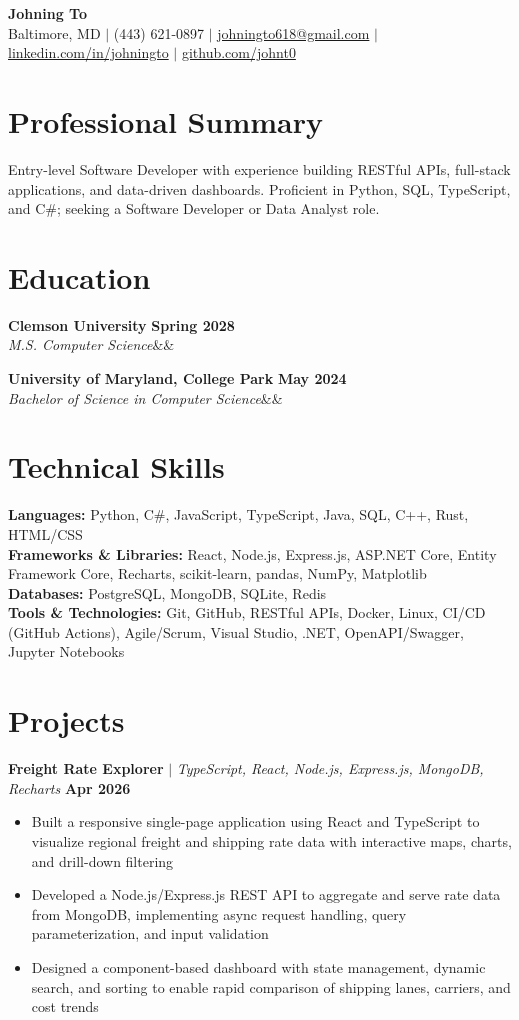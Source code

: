 \documentclass[11pt,letterpaper]{article}
\makeatletter
\newcommand{\name}{Johning To}
\newcommand{\phone}{(443) 621-0897}
\newcommand{\email}{johningto618@gmail.com}
\newcommand{\linkedin}{linkedin.com/in/johningto}
\newcommand{\github}{github.com/johnt0}
\newcommand{\location}{Baltimore, MD}
\newcommand{\summary}{Entry-level Software Developer with experience building RESTful APIs, full-stack applications, and data-driven dashboards. Proficient in Python, SQL, TypeScript, and C\#; seeking a Software Developer or Data Analyst role.}
\newcommand{\languages}{Python, C\#, JavaScript, TypeScript, Java, SQL, C++, Rust, HTML/CSS}
\newcommand{\frameworks}{React, Node.js, Express.js, ASP.NET Core, Entity Framework Core, Recharts, scikit-learn, pandas, NumPy, Matplotlib}
\newcommand{\databases}{PostgreSQL, MongoDB, SQLite, Redis}
\newcommand{\toolstech}{Git, GitHub, RESTful APIs, Docker, Linux, CI/CD (GitHub Actions), Agile/Scrum, Visual Studio, .NET, OpenAPI/Swagger, Jupyter Notebooks}
\newcommand{\education}[4]{%
    \noindent\textbf{#1} \hfill \textbf{#2}\\
    \textit{#3}\ifx&#4&\else\hfill #4\fi\par
}
\newcommand{\project}[3]{
    \noindent\textbf{#1} $\mid$ \textit{#2} \hfill \textbf{#3}
}
\makeatother
\begin{document}
\begin{center}
    {\Huge \textbf{\name}}\\
    \location{} $\mid$ \phone{} $\mid$
    \href{mailto:\email}{\email} $\mid$
    \href{https://\linkedin}{\linkedin} $\mid$
    \href{https://\github}{\github}
\end{center}

\section{Professional Summary}
\summary

\section{Education}
\education{Clemson University}{Spring 2028}{M.S. Computer Science}{}
\vspace{2pt}
\education{University of Maryland, College Park}{May 2024}{Bachelor of Science in Computer Science}{}

\section{Technical Skills}
\textbf{Languages:} \languages\\
\textbf{Frameworks \& Libraries:} \frameworks\\
\textbf{Databases:} \databases\\
\textbf{Tools \& Technologies:} \toolstech

\section{Projects}

\project{Freight Rate Explorer}{TypeScript, React, Node.js, Express.js, MongoDB, Recharts}{Apr 2026}
\begin{itemize}
    \item Built a responsive single-page application using React and TypeScript to visualize regional freight and shipping rate data with interactive maps, charts, and drill-down filtering
    \item Developed a Node.js/Express.js REST API to aggregate and serve rate data from MongoDB, implementing async request handling, query parameterization, and input validation
    \item Designed a component-based dashboard with state management, dynamic search, and sorting to enable rapid comparison of shipping lanes, carriers, and cost trends
\end{itemize}
\end{document}
